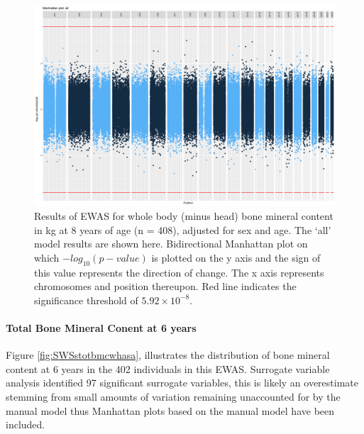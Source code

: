 \documentclass[
]{book}
\begin{document}
\begin{figure}

{\centering \includegraphics[width=0.8\linewidth]{figs/SWSttotbmcwhasaEPICewasManhattanAll} 

}

\caption{Results of EWAS for whole body (minus head) bone mineral content in kg at 8 years of age (n = 408), adjusted for sex and age. The `all' model results are shown here. Bidirectional Manhattan plot on which \(-log_{10}(p-value)\) is plotted on the y axis and the sign of this value represents the direction of change. The x axis represents chromosomes and position thereupon. Red line indicates the significance threshold of \(5.92\times10^{-8}\).}\label{fig:SWSttotbmcwhasaEPICewasManhattanSVA}
\end{figure}



\hypertarget{total-bone-mineral-conent-at-6-years}{%
\paragraph{Total Bone Mineral Conent at 6 years}\label{total-bone-mineral-conent-at-6-years}}

Figure \ref{fig:SWSstotbmcwhasa}, illustrates the distribution of bone mineral content at 6 years in the 402 individuals in this EWAS.
Surrogate variable analysis identified 97 significant surrogate variables, this is likely an overestimate stemming from small amounts of variation remaining unaccounted for by the manual model thus Manhattan plots based on the manual model have been included.
\end{document}
